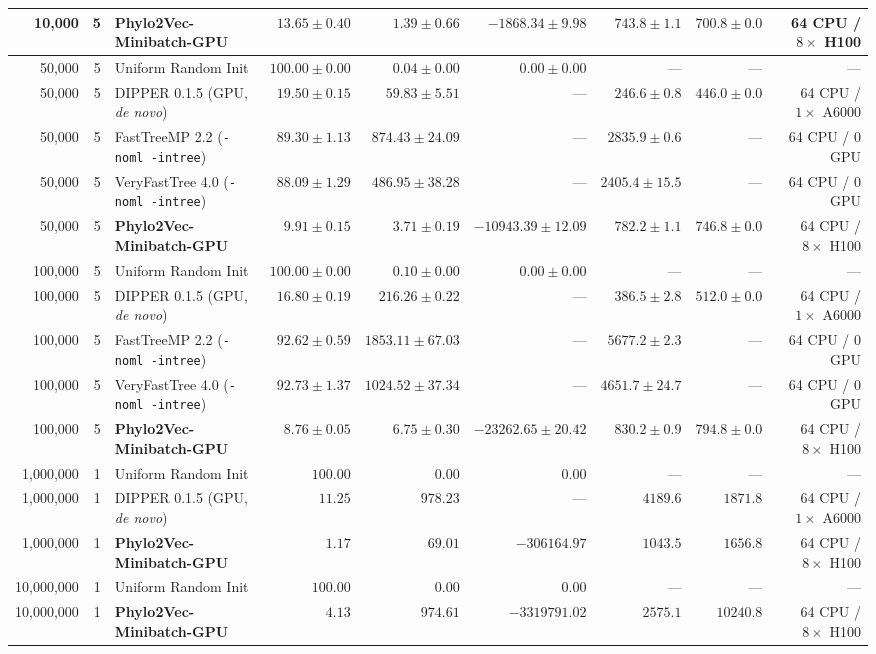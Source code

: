 \begin{table}[tbp]
\begin{tabular}{@{}rrlrrrrrr@{}}
10,000 & 5 & \textbf{Phylo2Vec-Minibatch-GPU} & $\mathbf{13.65 \pm 0.40}$ & $\mathbf{1.39 \pm 0.66}$ & $\mathbf{-1868.34 \pm 9.98}$ & $743.8 \pm 1.1$ & $700.8 \pm 0.0$ & 64 CPU / $8\times$ H100\\
\midrule
50,000 & 5 & Uniform Random Init & $100.00 \pm 0.00$ & $0.04 \pm 0.00$ & $0.00 \pm 0.00$ & --- & --- & ---\\
50,000 & 5 & DIPPER 0.1.5 (GPU, \textit{de novo}) & $19.50 \pm 0.15$ & $59.83 \pm 5.51$ & --- & $246.6 \pm 0.8$ & $446.0 \pm 0.0$ & 64 CPU / $1\times$ A6000\\
50,000 & 5 & FastTreeMP 2.2 (\texttt{-noml -intree}) & $89.30 \pm 1.13$ & $874.43 \pm 24.09$ & --- & $2835.9 \pm 0.6$ & --- & 64 CPU / 0 GPU\\
50,000 & 5 & VeryFastTree 4.0 (\texttt{-noml -intree}) & $88.09 \pm 1.29$ & $486.95 \pm 38.28$ & --- & $2405.4 \pm 15.5$ & --- & 64 CPU / 0 GPU\\
50,000 & 5 & \textbf{Phylo2Vec-Minibatch-GPU} & $\mathbf{9.91 \pm 0.15}$ & $\mathbf{3.71 \pm 0.19}$ & $\mathbf{-10943.39 \pm 12.09}$ & $782.2 \pm 1.1$ & $746.8 \pm 0.0$ & 64 CPU / $8\times$ H100\\
\midrule
100,000 & 5 & Uniform Random Init & $100.00 \pm 0.00$ & $0.10 \pm 0.00$ & $0.00 \pm 0.00$ & --- & --- & ---\\
100,000 & 5 & DIPPER 0.1.5 (GPU, \textit{de novo}) & $16.80 \pm 0.19$ & $216.26 \pm 0.22$ & --- & $386.5 \pm 2.8$ & $512.0 \pm 0.0$ & 64 CPU / $1\times$ A6000\\
100,000 & 5 & FastTreeMP 2.2 (\texttt{-noml -intree}) & $92.62 \pm 0.59$ & $1853.11 \pm 67.03$ & --- & $5677.2 \pm 2.3$ & --- & 64 CPU / 0 GPU\\
100,000 & 5 & VeryFastTree 4.0 (\texttt{-noml -intree}) & $92.73 \pm 1.37$ & $1024.52 \pm 37.34$ & --- & $4651.7 \pm 24.7$ & --- & 64 CPU / 0 GPU\\
100,000 & 5 & \textbf{Phylo2Vec-Minibatch-GPU} & $\mathbf{8.76 \pm 0.05}$ & $\mathbf{6.75 \pm 0.30}$ & $\mathbf{-23262.65 \pm 20.42}$ & $830.2 \pm 0.9$ & $794.8 \pm 0.0$ & 64 CPU / $8\times$ H100\\
\midrule
1,000,000 & 1 & Uniform Random Init & $100.00$ & $0.00$ & $0.00$ & --- & --- & ---\\
1,000,000 & 1 & DIPPER 0.1.5 (GPU, \textit{de novo}) & $11.25$ & $978.23$ & --- & $4189.6$ & $1871.8$ & 64 CPU / $1\times$ A6000\\
1,000,000 & 1 & \textbf{Phylo2Vec-Minibatch-GPU} & $\mathbf{1.17}$ & $\mathbf{69.01}$ & $\mathbf{-306164.97}$ & $\mathbf{1043.5}$ & $\mathbf{1656.8}$ & 64 CPU / $8\times$ H100\\
\midrule
10,000,000 & 1 & Uniform Random Init & $100.00$ & $0.00$ & $0.00$ & --- & --- & ---\\
10,000,000 & 1 & \textbf{Phylo2Vec-Minibatch-GPU} & $\mathbf{4.13}$ & $\mathbf{974.61}$ & $\mathbf{-3319791.02}$ & $\mathbf{2575.1}$ & $10240.8$ & 64 CPU / $8\times$ H100\\
\bottomrule
\end{tabular}
\end{table}

